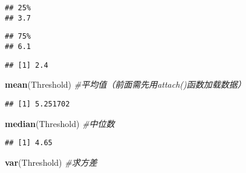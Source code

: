 \documentclass[
]{book}
\newenvironment{Shaded}{\begin{snugshade}}{\end{snugshade}}
\newcommand{\CommentTok}[1]{\textcolor[rgb]{0.56,0.35,0.01}{\textit{#1}}}
\newcommand{\FloatTok}[1]{\textcolor[rgb]{0.00,0.00,0.81}{#1}}
\newcommand{\FunctionTok}[1]{\textcolor[rgb]{0.13,0.29,0.53}{\textbf{#1}}}
\newcommand{\NormalTok}[1]{#1}
\newcommand{\SpecialCharTok}[1]{\textcolor[rgb]{0.81,0.36,0.00}{\textbf{#1}}}
\theoremstyle{definition}
\theoremstyle{definition}
\theoremstyle{definition}
\theoremstyle{definition}
\theoremstyle{remark}
\begin{document}
\begin{verbatim}
## 25% 
## 3.7
\end{verbatim}

\begin{Shaded}
\end{Shaded}

\begin{verbatim}
## 75% 
## 6.1
\end{verbatim}

\begin{Shaded}
\end{Shaded}

\begin{verbatim}
## [1] 2.4
\end{verbatim}

\begin{Shaded}
\begin{Highlighting}[]
\FunctionTok{mean}\NormalTok{(Threshold) }\CommentTok{\#平均值（前面需先用attach()函数加载数据）}
\end{Highlighting}
\end{Shaded}

\begin{verbatim}
## [1] 5.251702
\end{verbatim}

\begin{Shaded}
\begin{Highlighting}[]
\FunctionTok{median}\NormalTok{(Threshold) }\CommentTok{\#中位数}
\end{Highlighting}
\end{Shaded}

\begin{verbatim}
## [1] 4.65
\end{verbatim}

\begin{Shaded}
\begin{Highlighting}[]
\FunctionTok{var}\NormalTok{(Threshold) }\CommentTok{\#求方差}
\end{Highlighting}
\end{Shaded}
\end{document}

